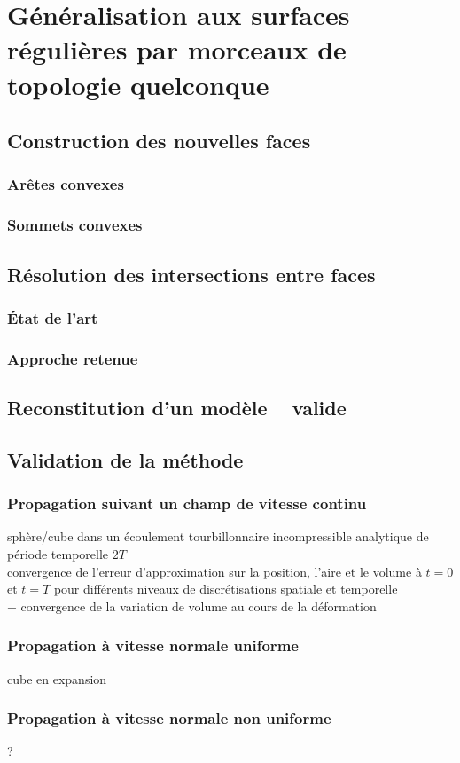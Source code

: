 \chapter{Généralisation aux surfaces régulières par morceaux de topologie quelconque}

\section{Construction des nouvelles faces}
\subsection{Arêtes convexes}
\subsection{Sommets convexes}



\section{Résolution des intersections entre faces}
\subsection{État de l'art}
\subsection{Approche retenue}



\section{Reconstitution d'un modèle \brep~ valide}



\section{Validation de la méthode}

\subsection{Propagation suivant un champ de vitesse continu}
sphère/cube dans un écoulement tourbillonnaire incompressible analytique de période temporelle $2T$\\
convergence de l'erreur d'approximation sur la position, l'aire et le volume à $t = 0$ et $t = T$ pour différents niveaux de discrétisations spatiale et temporelle\\
+ convergence de la variation de volume au cours de la déformation

\subsection{Propagation à vitesse normale uniforme}
cube en expansion

\subsection{Propagation à vitesse normale non uniforme}
?